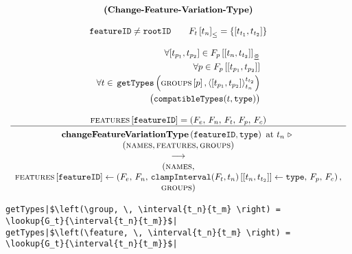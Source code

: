 \begin{figure}
    \renewcommand{\arraystretch}{1.1}
    \sossize$$\begin{array}{c}
      \ntyperule{Change-Feature-Variation-Type}
      {\\
        \var{featureID} \neq \var{rootID} \qquad
        \containing{F_t}{t_n} = \set{\interval{t_{t_1}}{t_{t_2}}} %
        \\
        \\
        \begin{split}
           \forall \interval{t_{p_1}}{t_{p_2}} \in \overlapping{F_p}{t_n}{t_{t_2}}  \\ %
          \forall p \in \lookup{F_p}{\interval{t_{p_1}}{t_{p_2}}}  \\%
          \forall t \in \, \var{getTypes}\left(\lookup{\groups}{p}, \clamp{\interval{t_{p_1}}{t_{p_2}}}{t_n}{t_{t_2}}\right)  \\
           \big(\var{compatibleTypes}(t, \var{type})\big) 
        \end{split}\\
        \\
        \lookup{\features{}}{\var{featureID}} = \feature
      }
      {
        \textbf{changeFeatureVariationType}\left( \var{featureID}, \var{type}\right) \text{ at } t_n \shove \\
        (\names{}, \features{}, \groups{}) \\
        \transition \\
        (\names{}, \\
        \lookup{\features{}}{\var{featureID}} \assign \left( F_e,\, F_n,\, 
        \lookup{\var{clampInterval}(F_t, t_n)}{\interval{t_n}{t_{t_2}}} \assign \var{type},\, F_p,\, F_c \right),
        \\ \groups{})
      }
    \end{array}$$
  \caption{\label{rule:change-feature-varation-type}}
\end{figure}

\begin{figure}
  \begin{verbatim}
getTypes|$\left(\group, \, \interval{t_n}{t_m} \right) = \lookup{G_t}{\interval{t_n}{t_m}}$|
getTypes|$\left(\feature, \, \interval{t_n}{t_m} \right) = \lookup{G_t}{\interval{t_n}{t_m}}$|
  \end{verbatim}
  \caption{\label{get-types}}
\end{figure}

